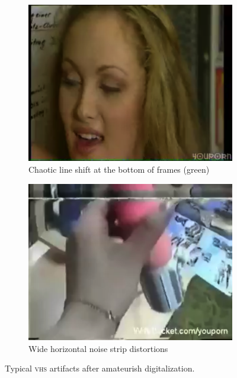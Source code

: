 \documentclass[runningheads,a4paper]{llncs}
\begin{document}
\begin{figure}[float=t]
  \centering
  \begin{subfigure}[b]{0.3\linewidth}
    \centering
    \includegraphics[width=\textwidth]{lineshift.png}
    \caption{Chaotic line shift at the bottom of frames (green)}
     \label{fig:ghosting}
  \end{subfigure}
  \begin{subfigure}[b]{0.3\linewidth}
    \centering
    \includegraphics[width=\textwidth]{distortion.png}
    \caption{Wide horizontal noise strip distortions}
     \label{fig:distortion}
  \end{subfigure}
  \label{fig:artifacts}
  \vspace{-.7em}
  \caption{Typical {\scshape vhs} artifacts after amateurish digitalization.}
  \vspace{-1em}
\end{figure}
\end{document}

